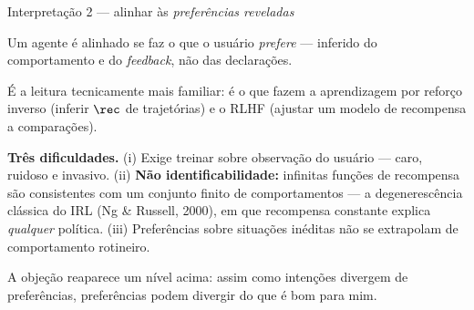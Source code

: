 \documentclass[aspectratio=169, 11pt]{beamer}
\begin{document}
\begin{frame}{Interpretação 2 --- alinhar às \emph{preferências reveladas}}
  \begin{defbox}{}
    Um agente é alinhado se faz o que o usuário \emph{prefere} --- inferido do
    comportamento e do \emph{feedback}, não das declarações.
  \end{defbox}

  {\small É a leitura tecnicamente mais familiar: é o que fazem a
  \alert{aprendizagem por reforço inverso} (inferir $\rec$ de trajetórias) e o
  \alert{RLHF} (ajustar um modelo de recompensa a comparações).}

  \begin{alertabox}
    {\small\textbf{Três dificuldades.} (i) Exige treinar sobre observação do
    usuário --- caro, ruidoso e invasivo. (ii) \textbf{Não identificabilidade:}
    infinitas funções de recompensa são consistentes com um conjunto finito de
    comportamentos --- a degenerescência clássica do IRL (Ng \& Russell, 2000),
    em que recompensa constante explica \emph{qualquer} política.
    (iii) Preferências sobre situações inéditas não se extrapolam de
    comportamento rotineiro.}
  \end{alertabox}

  \vspace{-0.3em}
  {\footnotesize A objeção reaparece um nível acima: assim como intenções
  divergem de preferências, preferências podem divergir do que é bom para mim.}
\end{frame}
\end{document}
